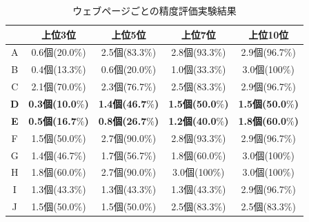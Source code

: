 \begin{table}[H]
    \caption{ウェブページごとの精度評価実験結果}
    \label{table:evaluation01-2}
    \centering
     \begin{tabular}{c||cccc}
      \hline
      & 上位3位 & 上位5位 & 上位7位 & 上位10位 \\
      \hline \hline
      A & 0.6個(20.0$\%$) & 2.5個(83.3$\%$) & 2.8個(93.3$\%$) & 2.9個(96.7$\%$) \\
      B & 0.4個(13.3$\%$) & 0.6個(20.0$\%$) & 1.0個(33.3$\%$) & 3.0個(100$\%$) \\
      C & 2.1個(70.0$\%$) & 2.3個(76.7$\%$) & 2.5個(83.3$\%$) & 2.9個(96.7$\%$) \\
      {\bf D} & {\bf 0.3個(10.0$\%$)} & {\bf 1.4個(46.7$\%$)} & {\bf 1.5個(50.0$\%$)} & {\bf 1.5個(50.0$\%$)} \\
      {\bf E} & {\bf 0.5個(16.7$\%$)} & {\bf 0.8個(26.7$\%$)} & {\bf 1.2個(40.0$\%$)} & {\bf 1.8個(60.0$\%$)} \\
      F & 1.5個(50.0$\%$) & 2.7個(90.0$\%$) & 2.8個(93.3$\%$) & 2.9個(96.7$\%$) \\
      G & 1.4個(46.7$\%$) & 1.7個(56.7$\%$) & 1.8個(60.0$\%$) & 3.0個(100$\%$) \\
      H & 1.8個(60.0$\%$) & 2.7個(90.0$\%$) & 3.0個(100$\%$) & 3.0個(100$\%$) \\
      I & 1.3個(43.3$\%$) & 1.3個(43.3$\%$) & 1.3個(43.3$\%$) & 2.9個(96.7$\%$) \\
      J & 1.5個(50.0$\%$) & 1.5個(50.0$\%$) & 2.5個(83.3$\%$) & 2.5個(83.3$\%$) \\
      \hline
    \end{tabular}
\end{table}


